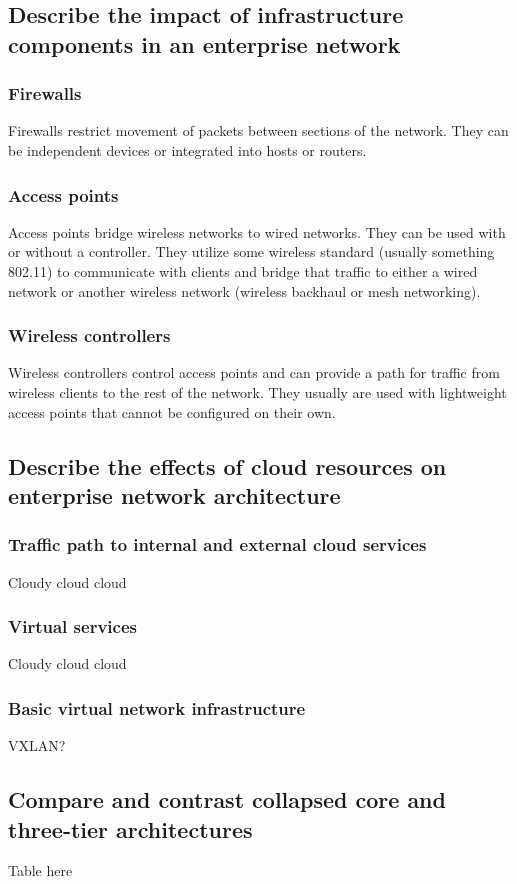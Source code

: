 \documentclass[10pt]{article}
\begin{document}
\subsection{Describe the impact of infrastructure components in an enterprise network}
\subsubsection{Firewalls}
Firewalls restrict movement of packets between sections of the network. They can be independent devices or integrated into hosts or routers.

\subsubsection{Access points}
Access points bridge wireless networks to wired networks. They can be used with or without a controller.
They utilize some wireless standard (usually something 802.11) to communicate with clients and bridge that traffic to either a wired network or 
another wireless network (wireless backhaul or mesh networking).

\subsubsection{Wireless controllers}
Wireless controllers control access points and can provide a path for traffic from wireless clients to the rest of the network. They usually are used 
with lightweight access points that cannot be configured on their own.

\subsection{Describe the effects of cloud resources on enterprise network architecture}
\subsubsection{Traffic path to internal and external cloud services}
Cloudy cloud cloud
\subsubsection{Virtual services}
Cloudy cloud cloud
\subsubsection{Basic virtual network infrastructure}
VXLAN?

\subsection{Compare and contrast collapsed core and three-tier architectures}
Table here
\end{document}
